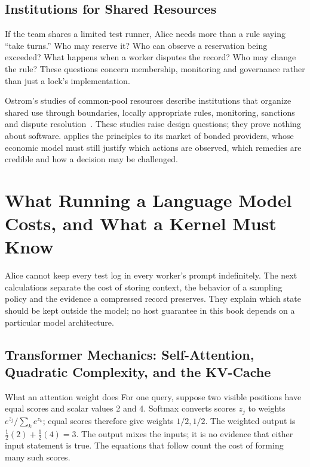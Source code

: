 \subsection{Institutions for Shared Resources}
If the team shares a limited test runner, Alice needs more than a rule saying
``take turns.'' Who may reserve it? Who can observe a reservation being exceeded?
What happens when a worker disputes the record? Who may change the rule?
These questions concern membership, monitoring and governance rather than
just a lock's implementation.

Ostrom's studies of common-pool resources describe institutions that organize
shared use through boundaries, locally appropriate rules, monitoring, sanctions
and dispute resolution~. These studies raise
design questions; they prove nothing about software.  applies the
principles to its market of bonded providers, whose economic model must
still justify which actions are observed, which remedies are credible and how
a decision may be challenged.

\section{What Running a Language Model Costs, and What a Kernel Must Know}\label{sec:prereq-llm-physics}

Alice cannot keep every test log in every worker's prompt indefinitely. The next calculations separate the cost of storing context, the behavior of a sampling policy and the evidence a compressed record preserves. They explain which state should be kept outside the model; no host guarantee in this book depends on a particular model architecture.

\subsection{Transformer Mechanics: Self-Attention, Quadratic Complexity, and the KV-Cache}

\begin{pdexample}{What an attention weight does}
For one query, suppose two visible positions have equal scores and scalar
values 2 and 4. Softmax converts scores $z_j$ to weights
$e^{z_j}/\sum_k e^{z_k}$; equal scores therefore give weights $1/2,1/2$.
The weighted output is $\tfrac12(2)+\tfrac12(4)=3$. The output mixes the
inputs; it is no evidence that either input statement is true. The equations
that follow count the cost of forming many such scores.
\end{pdexample}

